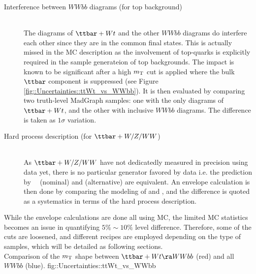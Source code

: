\begin{description}
\item [Interference between $WWbb$ diagrams (for top background)] \mbox{} \\
The diagrams of $\ttbar+Wt$ and the other $WWbb$ diagrams do interfere each other since they are in the common final states.
This is actually missed in the MC description as the involvement of top-quarks is explicitly required in the sample generateion of top backgrounds. 
The impact is known to be significant after a high $m_{\mathrm{T}}$ cut is applied where the bulk $\ttbar$ component is suppressed (see Figure \ref{fig::Uncertainties::ttWt_vs_WWbb}).
It is then evaluated by comparing two truth-level MadGraph samples: one with the only diagrams of $\ttbar+Wt$, and the other with inclusive $WWbb$ diagrams.
The difference is taken as $1\sigma$ variation.


\item [Hard process description (for $\ttbar+W/Z/WW$)] \mbox{} \\
As $\ttbar+W/Z/WW$ have not dedicatedly measured in precision using data yet, there is no particular generator favored by data 
i.e. the prediction by \MGMCatNLO $\mbox{\phantom{k}}$ (nominal) and \sherpa (alternative) are equivalent.
An envelope calculation is then done by comparing the modeling of \mgmc and \sherpa, and the difference is quoted as a systematics in terms of the hard process description.
\end{description}

\noindent While the envelope calculations are done all using MC, 
the limited MC statistics becomes an issue in quantifying $5\%\sim10\%$ level difference.
Therefore, some of the cuts are loosened, and different recipes are employed depending on the type of samples, which will be detailed as following sections. \\


{Comparison of the $m_{\mathrm{T}}$ shape between $\ttbar+Wt \ra WWbb$ (red) and all $WWbb$ (blue).}
{fig::Uncertainties::ttWt_vs_WWbb}


\clearpage
